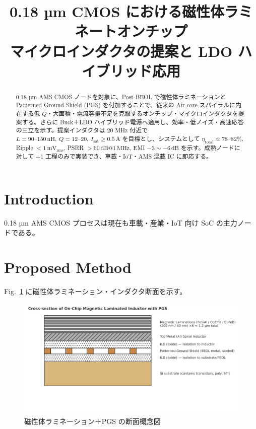 \documentclass[conference]{IEEEtran}
\begin{document}
\title{0.18 µm CMOS における磁性体ラミネートオンチップ\\
マイクロインダクタの提案と LDO ハイブリッド応用}

\author{
}

\maketitle

\begin{abstract}
0.18 µm AMS CMOS ノードを対象に、Post-BEOL で磁性体ラミネーションと Patterned Ground Shield (PGS) を付加することで、従来の Air-core スパイラルに内在する低 $Q$・大面積・電流容量不足を克服するオンチップ・マイクロインダクタを提案する。さらに Buck＋LDO ハイブリッド電源へ適用し、効率・低ノイズ・高速応答の三立を示す。提案インダクタは 20 MHz 付近で $L=90\text{--}150\,\mathrm{nH},~Q=12\text{--}20,~I_\mathrm{sat}\ge0.5\,\mathrm{A}$ を目標とし、システムとして $\eta_\mathrm{total}\approx 78\text{--}82\%$, Ripple $<1\,\mathrm{mV_{rms}}$, PSRR $>60\,\mathrm{dB}@1\,\mathrm{MHz}$, EMI $-3\sim -6\,\mathrm{dB}$ を示す。成熟ノードに対して +1 工程のみで実装でき、車載・IoT・AMS 混載 IC に即応する。
\end{abstract}

\section{Introduction}
0.18 µm AMS CMOS プロセスは現在も車載・産業・IoT 向け SoC の主力ノードである。%

\section{Proposed Method}
Fig.~\ref{fig1} に磁性体ラミネーション・インダクタ断面を示す。

\begin{figure}[htbp]
\centering
\includegraphics[width=0.8\linewidth]{fig/fig1_laminated_cross_section.png}
\caption{磁性体ラミネーション＋PGS の断面概念図}
\label{fig1}
\end{figure}
\end{document}
